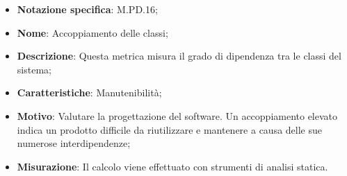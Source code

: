 \begin{itemize}
    \item \textbf{Notazione specifica}: M.PD.16;
    \item \textbf{Nome}: Accoppiamento delle classi;
    \item \textbf{Descrizione}: Questa metrica misura il grado di dipendenza tra le classi del sistema;
    \item \textbf{Caratteristiche}: Manutenibilità;
    \item \textbf{Motivo}: Valutare la progettazione del software. Un accoppiamento elevato indica un prodotto difficile da riutilizzare e mantenere a causa delle sue numerose interdipendenze;
    \item \textbf{Misurazione}: Il calcolo viene effettuato con strumenti di analisi statica.
\end{itemize}
